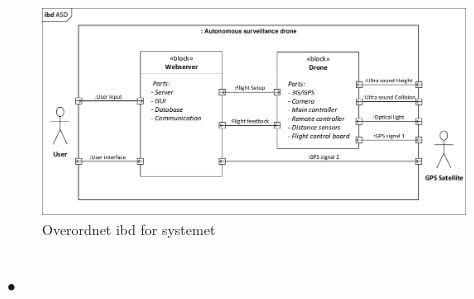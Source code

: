 \begin{figure}[H]
	\centering
	\includegraphics[width=1\textwidth]{Billeder/Projektbeskrivelse/ibd1_overordnet.pdf}
	\caption{Overordnet ibd for systemet}
	\label{fig:ibd_asd}
\end{figure}




\subsection{•}